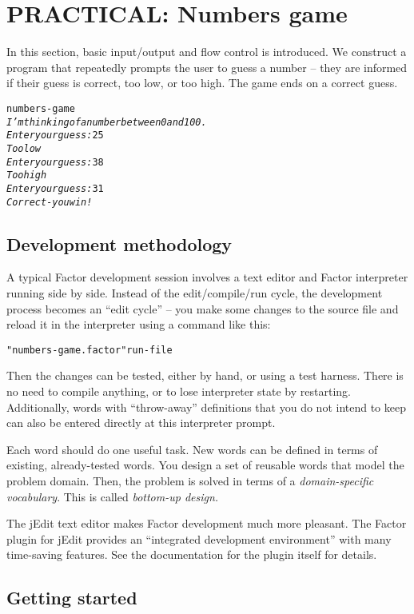 \documentclass[english]{article}
\begin{document}
\section{PRACTICAL: Numbers game}

In this section, basic input/output and flow control is introduced.
We construct a program that repeatedly prompts the user to guess a
number -- they are informed if their guess is correct, too low, or
too high. The game ends on a correct guess.

\begin{alltt}
numbers-game
\emph{I'm thinking of a number between 0 and 100.}
\emph{Enter your guess:} 25
\emph{Too low}
\emph{Enter your guess:} 38
\emph{Too high}
\emph{Enter your guess:} 31
\emph{Correct - you win!}
\end{alltt}

\subsection{Development methodology}

A typical Factor development session involves a text editor and Factor
interpreter running side by side. Instead of the edit/compile/run
cycle, the development process becomes an {}``edit cycle'' -- you
make some changes to the source file and reload it in the interpreter
using a command like this:

\begin{alltt}
"numbers-game.factor" run-file
\end{alltt}
Then the changes can be tested, either by hand, or using a test harness.
There is no need to compile anything, or to lose interpreter state
by restarting. Additionally, words with {}``throw-away'' definitions
that you do not intend to keep can also be entered directly at this
interpreter prompt.

Each word should do one useful task. New words can be defined in terms
of existing, already-tested words. You design a set of reusable words
that model the problem domain. Then, the problem is solved in terms
of a \emph{domain-specific vocabulary}. This is called \emph{bottom-up
design.}

The jEdit text editor makes Factor development much more pleasant.
The Factor plugin for jEdit provides an {}``integrated development
environment'' with many time-saving features. See the documentation
for the plugin itself for details.


\subsection{Getting started}
\end{document}
